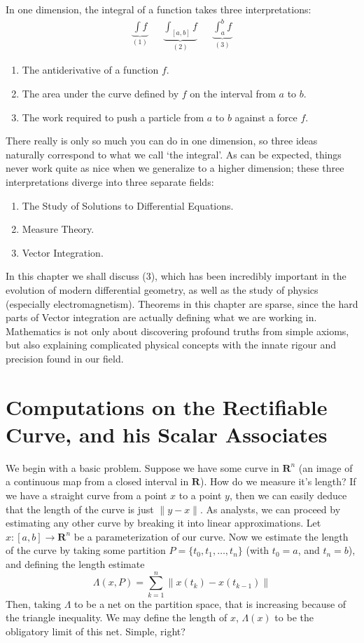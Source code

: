 \documentclass[12pt]{amsbook}
\theoremstyle{plain}
\theoremstyle{definition}
\begin{document}
In one dimension, the integral of a function takes three interpretations:
%
\begin{align*}
    \underbrace{\int f}_{(1)} && \underbrace{\int_{[a,b]} f}_{(2)} && \underbrace{\int_a^b f}_{(3)}
\end{align*}
%
\begin{enumerate}
    \item The antiderivative of a function $f$.
    \item The area under the curve defined by $f$ on the interval from $a$ to $b$.
    \item The work required to push a particle from $a$ to $b$ against a force $f$.
\end{enumerate}
%
There really is only so much you can do in one dimension, so three ideas naturally correspond to what we call `the integral'. As can be expected, things never work quite as nice when we generalize to a higher dimension; these three interpretations diverge into three separate fields:
%
\begin{enumerate}
    \item The Study of Solutions to Differential Equations.
    \item Measure Theory.
    \item Vector Integration.
\end{enumerate}
%
In this chapter we shall discuss (3), which has been incredibly important in the evolution of modern differential geometry, as well as the study of physics (especially electromagnetism). Theorems in this chapter are sparse, since the hard parts of Vector integration are actually defining what we are working in. Mathematics is not only about discovering profound truths from simple axioms, but also explaining complicated physical concepts with the innate rigour and precision found in our field.





\section{Computations on the Rectifiable Curve, and his Scalar Associates}

We begin with a basic problem. Suppose we have some curve in $\mathbf{R}^n$ (an image of a continuous map from a closed interval in $\mathbf{R}$). How do we measure it's length? If we have a straight curve from a point $x$ to a point $y$, then we can easily deduce that the length of the curve is just $\| y - x \|$. As analysts, we can proceed by estimating any other curve by breaking it into linear approximations. Let $x:[a,b] \to \mathbf{R}^n$ be a parameterization of our curve. Now we estimate the length of the curve by taking some partition $P = \{t_0, t_1, \dots, t_n \}$ (with $t_0 = a$, and $t_n = b$), and defining the length estimate
%
\[ \Lambda(x,P) = \sum_{k = 1}^n \left\|x(t_k) - x(t_{k-1})\right\| \]
%
Then, taking $\Lambda$ to be a net on the partition space, that is increasing because of the triangle inequality. We may define the length of $x$, $\Lambda(x)$ to be the obligatory limit of this net. Simple, right?
\end{document}
